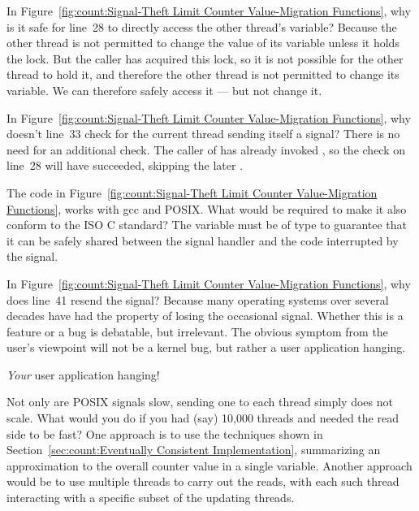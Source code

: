 \QuickQ{}
	In Figure~\ref{fig:count:Signal-Theft Limit Counter Value-Migration Functions},
	why is it safe for line~28 to directly access the other thread's
	 variable?
\QuickA{}
	Because the other thread is not permitted to change the value
	of its  variable unless it holds the
	 lock.
	But the caller has acquired this lock, so it is not possible
	for the other thread to hold it, and therefore the other thread
	is not permitted to change its  variable.
	We can therefore safely access it --- but not change it.

\QuickQ{}
	In Figure~\ref{fig:count:Signal-Theft Limit Counter Value-Migration Functions},
	why doesn't line~33 check for the current thread sending itself
	a signal?
\QuickA{}
	There is no need for an additional check.
	The caller of  has already invoked
	, so the check on line~28 will have
	succeeded, skipping the later .

\QuickQ{}
	The code in
	Figure~\ref{fig:count:Signal-Theft Limit Counter Value-Migration Functions},
	works with gcc and POSIX.
	What would be required to make it also conform to the ISO C standard?
\QuickA{}
	The  variable must be of type 
	to guarantee that it can be safely shared between the signal
	handler and the code interrupted by the signal.

\QuickQ{}
	In Figure~\ref{fig:count:Signal-Theft Limit Counter Value-Migration Functions}, why does line~41 resend the signal?
\QuickA{}
	Because many operating systems over several decades have
	had the property of losing the occasional signal.
	Whether this is a feature or a bug is debatable, but
	irrelevant.
	The obvious symptom from the user's viewpoint will not be
	a kernel bug, but rather a user application hanging.

	\emph{Your} user application hanging!

\QuickQ{}
	Not only are POSIX signals slow, sending one to each thread
	simply does not scale.
	What would you do if you had (say) 10,000 threads and needed
	the read side to be fast?
\QuickA{}
	One approach is to use the techniques shown in
	Section~\ref{sec:count:Eventually Consistent Implementation},
	summarizing an approximation to the overall counter value in
	a single variable.
	Another approach would be to use multiple threads to carry
	out the reads, with each such thread interacting with a
	specific subset of the updating threads.

